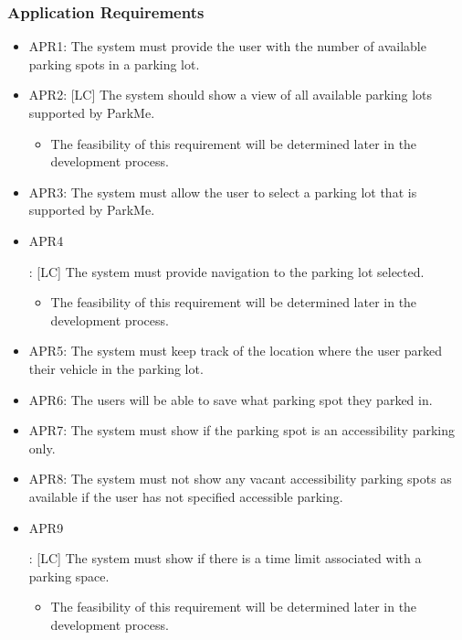 \documentclass[]{article}
\begin{document}
	\subsubsection{Application Requirements}
	\begin{itemize}
		\item APR1: The system must provide the user with the number of available parking spots in a parking lot.
		
		\item APR2: [LC] The system should show a view of all available parking lots supported by ParkMe.
		\begin{itemize}
			\item The feasibility of this requirement will be determined later in the development process. 
		\end{itemize}
		
		\item APR3: The system must allow the user to select a parking lot that is supported by ParkMe.
	
		\item \hypertarget{APRa}{APR4}: [LC] The system must provide navigation to the parking lot selected.
		\begin{itemize}
			\item The feasibility of this requirement will be determined later in the development process.
		\end{itemize}
		
		\item APR5: The system must keep track of the location where the user parked their vehicle in the parking lot.
		
		\item APR6: The users will be able to save what parking spot they parked in.
		
		\item APR7: The system must show if the parking spot is an accessibility parking only.
		
		\item APR8: The system must not show any vacant accessibility parking spots as available if the user has not specified accessible parking.
		
		\item \hypertarget{APRb}{APR9}: [LC] The system must show if there is a time limit associated with a parking space.
		\begin{itemize}
			\item The feasibility of this requirement will be determined later in the development process.
		\end{itemize}
	

\end{itemize}
\end{document}
